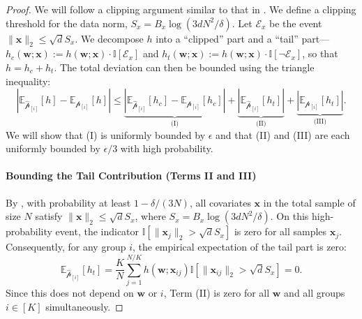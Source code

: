 \documentclass[11pt]{article}
\numberwithin{thm}{section}
\theoremstyle{plain}
\theoremstyle{definition}
\theoremstyle{remark} \newtheorem{remark}[thm]{Remark}
\def\eps{{\epsilon}}
\def\vw{{\bm{w}}}
\def\vx{{\bm{x}}}
\def\ep{\widehat{\mathcal{p}}}
\def\pp{{\mathcal{p}}}
\newcommand{\E}{\mathbb{E}}
\newcommand{\ppi}{{\pp_{[i]}}}
\newcommand{\epi}{\ep_{[i]}}
\begin{document}
\begin{proof}
We will follow a clipping argument similar to that in .
We define a clipping threshold for the data norm, $S_x = B_x \log(3dN^2/\delta)$. 
Let $\mathcal{E}_x$ be the event $\|\vx\|_2 \le \sqrt{d}S_x$. 
We decompose $h$ into a ``clipped'' part and a ``tail'' part---$h_c(\vw; \vx) := h(\vw; \vx) \cdot \mathbb{I}[\mathcal{E}_x]$ and $h_t(\vw; \vx) := h(\vw; \vx) \cdot \mathbb{I}[\neg\mathcal{E}_x]$,
so that $h = h_c + h_t$. 
The total deviation can then be bounded using the triangle inequality:
\[
|\E_{\epi}[h] - \E_{\ppi}[h]| \le \underbrace{|\E_{\epi}[h_c] - \E_{\ppi}[h_c]|}_{\text{(I)}} + \underbrace{|\E_{\epi}[h_t]|}_{\text{(II)}} + \underbrace{|\E_{\ppi}[h_t]|}_{\text{(III)}}.
\]
We will show that (I) is uniformly bounded by 
$\eps$
and that 
(II) and (III) are each uniformly bounded by $\epsilon/3$ with high probability.

\paragraph{Bounding the Tail Contribution (Terms II and III)}

By , with probability at least $1-\delta/(3N)$, 
all covariates $\vx$ in the total sample of size $N$ satisfy $\|\vx\|_2 \le \sqrt{d}S_x$, 
where $S_x = B_x\log(3dN^2/\delta)$. 
On this high-probability event, the indicator $\mathbb{I}[\|\vx_j\|_2 > \sqrt{d}S_x]$ 
is zero for all samples $\vx_j$. 
Consequently, for any group $i$, the empirical expectation of the tail part is zero:
\[
\E_{\epi}[h_t] = \frac{K}{N}\sum_{j=1}^{N/K} h(\vw;\vx_{ij})\mathbb{I}[\|\vx_{ij}\|_2 > \sqrt{d}S_x] = 0.
\]
Since this does not depend on $\vw$ or $i$, 
Term (II) is zero for all $\vw$ and all groups $i \in [K]$ simultaneously.


\end{proof}
\end{document}
